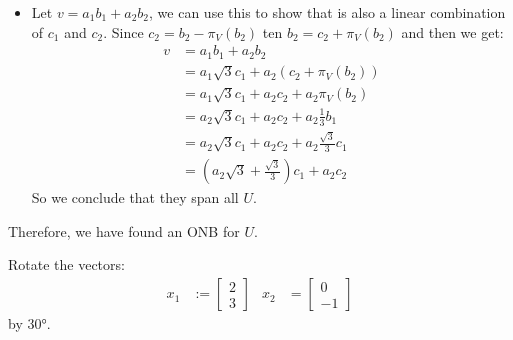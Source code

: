 \documentclass[final,expand]{problemset}
\begin{document}
{\begin{itemize}
		\item Let $v = a_1b_1 + a_2b_2$, we can use this to show that is also a linear combination of $c_1$ and $c_2$. Since $c_2 = b_2 - \pi_V(b_2)$ ten $b_2 = c_2 + \pi_V(b_2)$ and then we get:
		\begin{align*}
			v &= a_1b_1 + a_2b_2\\
			&= a_1\sqrt{3}c_1 + a_2(c_2 + \pi_V(b_2))\\
			&= a_1\sqrt{3}c_1 + a_2c_2 + a_2\pi_V(b_2)\\
			&= a_2\sqrt{3}c_1 + a_2c_2 + a_2 \frac{1}{3}b_1\\
			&= a_2\sqrt{3}c_1 + a_2c_2 + a_2 \frac{\sqrt{3}}{3}c_1\\
			&= (a_2\sqrt{3} + \frac{\sqrt{3}}{3})c_1 + a_2c_2
		\end{align*}
		So we conclude that they span all $U$.
	\end{itemize}

	Therefore, we have found an ONB for $U$.
}

\problem Rotate the vectors:
\begin{align*}
	x_1 &:= \begin{bmatrix}
		2 \\ 3
	\end{bmatrix}&
	x_2 &= \begin{bmatrix}
		0 \\ -1
	\end{bmatrix}
\end{align*}
by $30°$.
\end{document}
